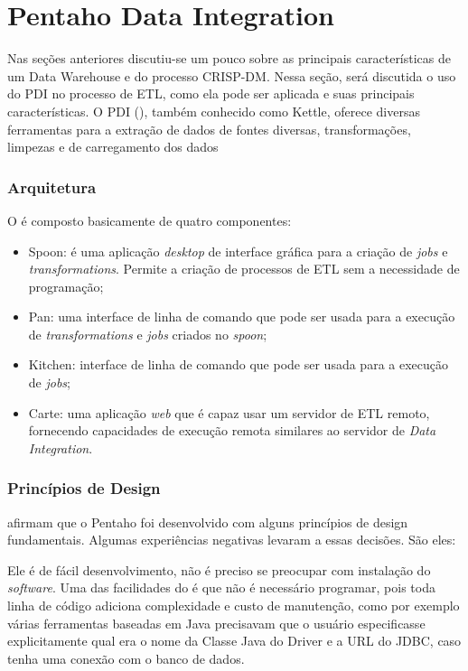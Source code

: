\section{Pentaho Data Integration}
Nas seções anteriores discutiu-se um pouco sobre as principais características de um Data Warehouse e do processo CRISP-DM. Nessa seção, será discutida o uso do PDI no processo de ETL, como ela pode ser aplicada e suas principais características.
O PDI (\textit{\pdi}), também conhecido como Kettle, oferece diversas ferramentas para a extração de dados de fontes diversas, transformações, limpezas e de carregamento dos dados
\subsubsection{Arquitetura}
O \pdi é composto basicamente de quatro componentes:
\begin{itemize}
    \item Spoon: é uma aplicação \textit{desktop} de interface gráfica para a criação de \textit{jobs} e \textit{transformations}. Permite a criação de processos de ETL sem a necessidade de programação;
    \item Pan: uma interface de linha de comando que pode ser usada para a execução de \textit{transformations} e \textit{jobs} criados no \textit{spoon};
    \item Kitchen: interface de linha de comando que pode ser usada para a execução de \textit{jobs};
    \item Carte: uma aplicação \textit{web} que é capaz usar um servidor de ETL remoto, fornecendo capacidades de execução remota similares ao servidor de \textit{Data Integration}.
\end{itemize}

\subsubsection{Princípios de Design}
 afirmam que o Pentaho foi desenvolvido com alguns princípios de design fundamentais. Algumas experiências negativas levaram a essas decisões. São eles:

Ele é de fácil desenvolvimento, não é preciso se preocupar com instalação do \textit{software}. Uma das facilidades do \pdi é que não é necessário programar, pois toda linha de código adiciona complexidade e custo de manutenção, como por exemplo  várias ferramentas baseadas em Java precisavam que o usuário especificasse explicitamente qual era o nome da Classe Java do Driver e a URL do JDBC, caso tenha uma conexão com o banco de dados. 

